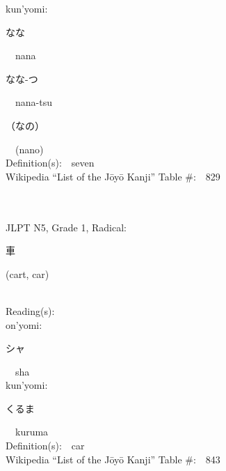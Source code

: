 \begin{multicols}{2}
{\hspace*{1em}}kun'yomi:\ \ \\
{\hspace*{2em}}{\begin{CJK}{UTF8}{min} なな \end{CJK}}\ \ nana\ \ \\
{\hspace*{2em}}{\begin{CJK}{UTF8}{min} なな-つ \end{CJK}}\ \ nana-tsu\ \ \\
{\hspace*{2em}}{\begin{CJK}{UTF8}{min} （なの） \end{CJK}}\ \ (nano)\ \ \\
Definition(s):\ \ seven \\
Wikipedia ``List of the J\=oy\=o Kanji'' Table \#:\ \ 829 \\
\ \ \\
{\fontsize{34pt}{40pt}  }\ \ \\  %
{JLPT N5, Grade 1, Radical:\ \ {\begin{CJK}{UTF8}{min} 車 \end{CJK}} (cart, car) } \\
Reading(s):\ \ \\
{\hspace*{1em}}on'yomi:\ \ \\
{\hspace*{2em}}{\begin{CJK}{UTF8}{min} シャ \end{CJK}}\ \ sha\ \ \\
{\hspace*{1em}}kun'yomi:\ \ \\
{\hspace*{2em}}{\begin{CJK}{UTF8}{min} くるま \end{CJK}}\ \ kuruma\ \ \\
Definition(s):\ \ car \\
Wikipedia ``List of the J\=oy\=o Kanji'' Table \#:\ \ 843 \\
\ \ \\
{\fontsize{34pt}{40pt}  }\ \ \\  %

\end{multicols}
